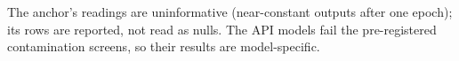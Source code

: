 \begin{table}[htbp]
\begin{threeparttable}
\begin{tablenotes}[flushleft]
\item The anchor's readings are uninformative (near-constant outputs after one epoch); its rows are reported, not read as nulls. The API models fail the pre-registered contamination screens, so their results are model-specific.
\end{tablenotes}
\end{threeparttable}
\end{table}
